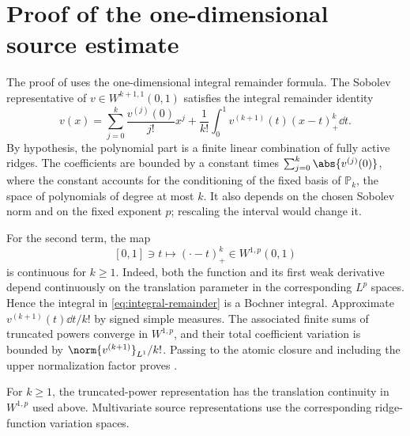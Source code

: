 \section{Proof of the one-dimensional source estimate}
\label{app:source}

The proof of  uses the one-dimensional integral remainder formula. The Sobolev representative of
\(v\in W^{k+1,1}(0,1)\) satisfies the integral remainder identity
\begin{equation}
 v(x)=\sum_{j=0}^k\frac{v^{(j)}(0)}{j!}x^j
 +\frac1{k!}\int_0^1 v^{(k+1)}(t)(x-t)_+^k\dd t.
 \label{eq:integral-remainder}
\end{equation}
By hypothesis, the polynomial part is a finite linear combination of fully active ridges. The
coefficients are bounded by a constant times \(\sum_{j=0}^k\abs{v^{(j)}(0)}\), where the constant
accounts for the conditioning of the fixed basis of \(\mathbb P_k\), the space of polynomials of
degree at most \(k\). It also depends on the chosen Sobolev norm and on the fixed exponent \(p\);
rescaling the interval would change it.

For the second term, the map
\[
 [0,1]\ni t\longmapsto (\cdot-t)_+^k\in W^{1,p}(0,1)
\]
is continuous for \(k\geq1\). Indeed, both the function and its first weak derivative depend
continuously on the translation parameter in the corresponding \(L^p\) spaces. Hence the integral in
\cref{eq:integral-remainder} is a Bochner integral. Approximate
\(v^{(k+1)}(t)\dd t/k!\) by signed simple measures. The associated finite sums of truncated powers
converge in \(W^{1,p}\), and their total coefficient variation is bounded by
\(\norm{v^{(k+1)}}_{L^1}/k!\). Passing to the atomic closure and including the upper normalization factor
proves .

For \(k\ge1\), the truncated-power representation has the translation continuity in \(W^{1,p}\) used above. Multivariate source representations use the corresponding ridge-function variation spaces.
